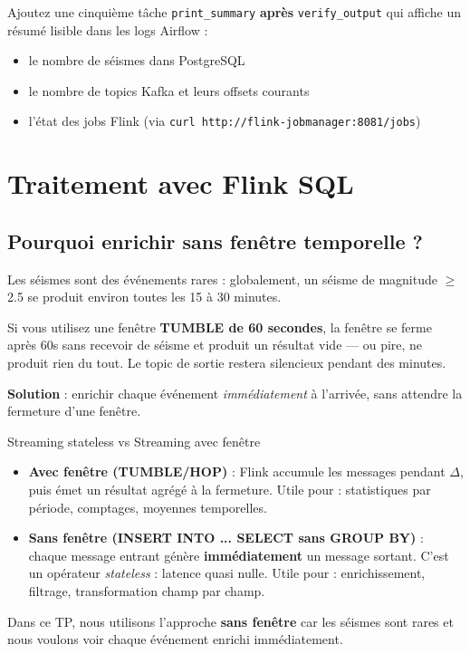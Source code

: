 \documentclass[12pt,a4paper]{article}
\begin{document}
Ajoutez une cinquième tâche \texttt{print\_summary} \textbf{après} \texttt{verify\_output}
qui affiche un résumé lisible dans les logs Airflow :

\begin{itemize}
  \item le nombre de séismes dans PostgreSQL
  \item le nombre de topics Kafka et leurs offsets courants
  \item l'état des jobs Flink (via \texttt{curl http://flink-jobmanager:8081/jobs})
\end{itemize}

\newpage

\section{Traitement avec Flink SQL}

\subsection{Pourquoi enrichir sans fenêtre temporelle ?}

Les séismes sont des événements rares : globalement, un séisme de magnitude $\geq$ 2.5
se produit environ toutes les 15 à 30 minutes.

\begin{warningbox}
  Si vous utilisez une fenêtre \textbf{TUMBLE de 60 secondes}, la fenêtre se ferme
  après 60s sans recevoir de séisme et produit un résultat vide --- ou pire,
  ne produit rien du tout. Le topic de sortie restera silencieux pendant des minutes.

  \textbf{Solution} : enrichir chaque événement \emph{immédiatement} à l'arrivée,
  sans attendre la fermeture d'une fenêtre.
\end{warningbox}

\begin{conceptbox}{Streaming stateless vs Streaming avec fenêtre}
  \begin{itemize}
    \item \textbf{Avec fenêtre (TUMBLE/HOP)} : Flink accumule les messages pendant
          $\Delta$, puis émet un résultat agrégé à la fermeture.
          Utile pour : statistiques par période, comptages, moyennes temporelles.
    \item \textbf{Sans fenêtre (INSERT INTO ... SELECT sans GROUP BY)} :
          chaque message entrant génère \textbf{immédiatement} un message sortant.
          C'est un opérateur \textit{stateless} : latence quasi nulle.
          Utile pour : enrichissement, filtrage, transformation champ par champ.
  \end{itemize}
  Dans ce TP, nous utilisons l'approche \textbf{sans fenêtre} car les séismes
  sont rares et nous voulons voir chaque événement enrichi immédiatement.
\end{conceptbox}
\end{document}
